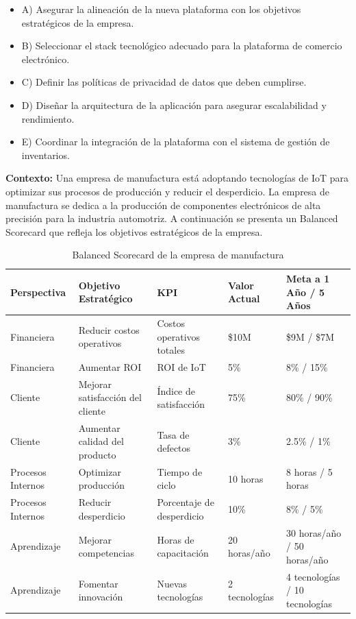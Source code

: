 \documentclass{article}
\begin{document}
\begin{enumerate}
    \begin{itemize}
        \item A) Asegurar la alineación de la nueva plataforma con los objetivos estratégicos de la empresa.
        \item B) Seleccionar el stack tecnológico adecuado para la plataforma de comercio electrónico.
        \item C) Definir las políticas de privacidad de datos que deben cumplirse.
        \item D) Diseñar la arquitectura de la aplicación para asegurar escalabilidad y rendimiento.
        \item E) Coordinar la integración de la plataforma con el sistema de gestión de inventarios.
    \end{itemize}

\end{enumerate}



    \newpage
    \textbf{Contexto:} Una empresa de manufactura está adoptando tecnologías de IoT para optimizar sus procesos de producción y reducir el desperdicio. La empresa de manufactura se dedica a la producción de componentes electrónicos de alta precisión para la industria automotriz. A continuación se presenta un Balanced Scorecard que refleja los objetivos estratégicos de la empresa.
    
    \begin{table}[h!]
    \centering
    \begin{tabular}{|l|l|l|l|l|}
    \hline
    \textbf{Perspectiva} & \textbf{Objetivo Estratégico} & \textbf{KPI} & \textbf{Valor Actual} & \textbf{Meta a 1 Año / 5 Años} \\ \hline
    Financiera & Reducir costos operativos & Costos operativos totales & \$10M & \$9M / \$7M \\ \hline
    Financiera & Aumentar ROI & ROI de IoT & 5\% & 8\% / 15\% \\ \hline
    Cliente & Mejorar satisfacción del cliente & Índice de satisfacción & 75\% & 80\% / 90\% \\ \hline
    Cliente & Aumentar calidad del producto & Tasa de defectos & 3\% & 2.5\% / 1\% \\ \hline
    Procesos Internos & Optimizar producción & Tiempo de ciclo & 10 horas & 8 horas / 5 horas \\ \hline
    Procesos Internos & Reducir desperdicio & Porcentaje de desperdicio & 10\% & 8\% / 5\% \\ \hline
    Aprendizaje & Mejorar competencias & Horas de capacitación & 20 horas/año & 30 horas/año / 50 horas/año \\ \hline
    Aprendizaje & Fomentar innovación & Nuevas tecnologías & 2 tecnologías & 4 tecnologías / 10 tecnologías \\ \hline
    \end{tabular}
    \caption{Balanced Scorecard de la empresa de manufactura}
    \end{table}
    
\end{document}
